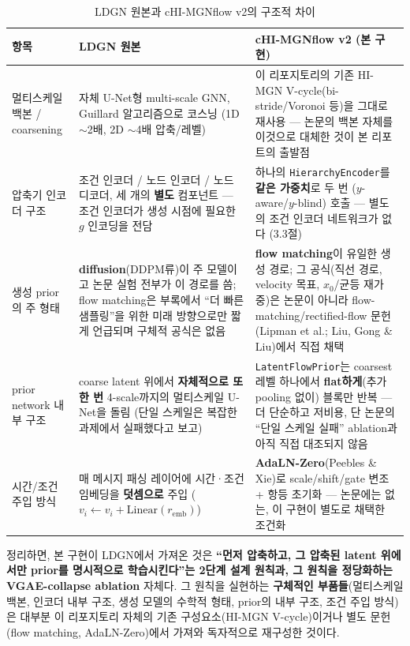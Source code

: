 \documentclass[11pt]{article}
\begin{document}
\begin{table}[h]
\centering
\footnotesize
\begin{tabularx}{\textwidth}{@{}l X X@{}}
\toprule
항목 & LDGN 원본 & cHI-MGNflow v2 (본 구현) \\
\midrule
멀티스케일 백본 / coarsening
  & 자체 U-Net형 multi-scale GNN, Guillard 알고리즘으로 코스닝 (1D
    $\sim$2배, 2D $\sim$4배 압축/레벨)
  & 이 리포지토리의 기존 HI-MGN V-cycle(bi-stride/Voronoi 등)을 그대로
    재사용 --- 논문의 백본 자체를 이것으로 대체한 것이 본 리포트의
    출발점 \\
압축기 인코더 구조
  & 조건 인코더 / 노드 인코더 / 노드 디코더, 세 개의 \textbf{별도}
    컴포넌트 --- 조건 인코더가 생성 시점에 필요한 $g$ 인코딩을 전담
  & 하나의 \texttt{HierarchyEncoder}를 \textbf{같은 가중치}로 두 번
    ($y$-aware/$y$-blind) 호출 --- 별도의 조건 인코더 네트워크가 없다
    (3.3절) \\
생성 prior의 주 형태
  & \textbf{diffusion}(DDPM류)이 주 모델이고 논문 실험 전부가 이 경로를
    씀; flow matching은 부록에서 ``더 빠른 샘플링''을 위한 미래 방향으로만
    짧게 언급되며 구체적 공식은 없음
  & \textbf{flow matching}이 유일한 생성 경로; 그 공식(직선 경로, velocity
    목표, $x_0$/균등 재가중)은 논문이 아니라 flow-matching/rectified-flow
    문헌(Lipman et al.; Liu, Gong \& Liu)에서 직접 채택 \\
prior network 내부 구조
  & coarse latent 위에서 \textbf{자체적으로 또 한 번} 4-scale까지의
    멀티스케일 U-Net을 돌림 (단일 스케일은 복잡한 과제에서 실패했다고
    보고)
  & \texttt{LatentFlowPrior}는 coarsest 레벨 하나에서
    \textbf{flat하게}(추가 pooling 없이) 블록만 반복 --- 더 단순하고
    저비용, 단 논문의 ``단일 스케일 실패'' ablation과 아직 직접
    대조되지 않음 \\
시간/조건 주입 방식
  & 매 메시지 패싱 레이어에 시간·조건 임베딩을 \textbf{덧셈으로} 주입
    ($v_i \leftarrow v_i + \mathrm{Linear}(r_{\mathrm{emb}})$)
  & \textbf{AdaLN-Zero}(Peebles \& Xie)로 scale/shift/gate 변조 + 항등
    초기화 --- 논문에는 없는, 이 구현이 별도로 채택한 조건화 \\
\bottomrule
\end{tabularx}
\caption{LDGN 원본과 cHI-MGNflow v2의 구조적 차이}
\end{table}

정리하면, 본 구현이 LDGN에서 가져온 것은 \textbf{``먼저 압축하고, 그
압축된 latent 위에서만 prior를 명시적으로 학습시킨다''는 2단계 설계
원칙과, 그 원칙을 정당화하는 VGAE-collapse ablation} 자체다. 그 원칙을
실현하는 \textbf{구체적인 부품들}(멀티스케일 백본, 인코더 내부 구조,
생성 모델의 수학적 형태, prior의 내부 구조, 조건 주입 방식)은 대부분
이 리포지토리 자체의 기존 구성요소(HI-MGN V-cycle)이거나 별도 문헌
(flow matching, AdaLN-Zero)에서 가져와 독자적으로 재구성한 것이다.
\end{document}

